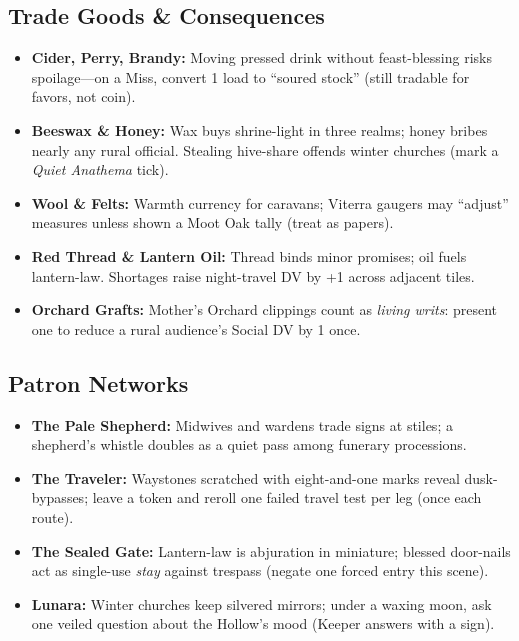 \subsection*{Trade Goods \& Consequences}
\begin{itemize}
  \item \textbf{Cider, Perry, Brandy:} Moving pressed drink without feast-blessing risks spoilage—on a Miss, convert 1 load to “soured stock” (still tradable for favors, not coin).
  \item \textbf{Beeswax \& Honey:} Wax buys shrine-light in three realms; honey bribes nearly any rural official. Stealing hive-share offends winter churches (mark a \emph{Quiet Anathema} tick).
  \item \textbf{Wool \& Felts:} Warmth currency for caravans; Viterra gaugers may “adjust” measures unless shown a Moot Oak tally (treat as papers).
  \item \textbf{Red Thread \& Lantern Oil:} Thread binds minor promises; oil fuels lantern-law. Shortages raise night-travel DV by +1 across adjacent tiles.
  \item \textbf{Orchard Grafts:} Mother’s Orchard clippings count as \emph{living writs}: present one to reduce a rural audience’s Social DV by 1 once.
\end{itemize}

\subsection*{Patron Networks}
\begin{itemize}
  \item \textbf{The Pale Shepherd:} Midwives and wardens trade signs at stiles; a shepherd’s whistle doubles as a quiet pass among funerary processions.
  \item \textbf{The Traveler:} Waystones scratched with eight-and-one marks reveal dusk-bypasses; leave a token and reroll one failed travel test per leg (once each route).
  \item \textbf{The Sealed Gate:} Lantern-law is abjuration in miniature; blessed door-nails act as single-use \emph{stay} against trespass (negate one forced entry this scene).
  \item \textbf{Lunara:} Winter churches keep silvered mirrors; under a waxing moon, ask one veiled question about the Hollow’s mood (Keeper answers with a sign).
\end{itemize}

